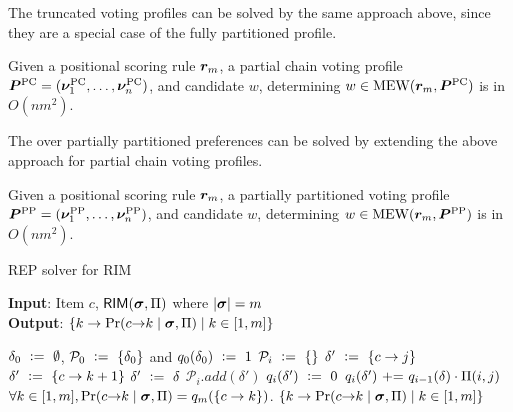 The truncated voting profiles can be solved by the same approach above, since they are a special case of the fully partitioned profile.

\def\theoremTractabilityOfPC{
  Given a positional scoring rule $\vr_m$, a partial chain voting profile $\pchainVP = (\enum[n]{\pchain})$, and candidate $w$, determining $w \in \mew(\vr_m, \pchainVP)$ is in $O(nm^2)$.
}

\begin{theorem} \label{theorem:tractability_of_pchainVP}
    \theoremTractabilityOfPC
\end{theorem}

The \mew over partially partitioned preferences can be solved by extending the above approach for partial chain voting profiles.

\def\theoremTractabilityOfPP{
  Given a positional scoring rule $\vr_m$, a partially partitioned voting profile $\parparVP = (\enum[n]{\parpar})$, and candidate $w$, determining $w \in \mew(\vr_m, \parparVP)$ is in $O(nm^2)$.
}

\begin{theorem} \label{theorem:tractability_of_parparVP}
  \theoremTractabilityOfPP
\end{theorem}

\begin{algorithm}[tb!]
\small 
  \raggedright
  \caption{REP solver for RIM}
  \label{alg:rim_rank_estimation}
  \textbf{Input}: Item $c$, $\mathsf{RIM}(\bm{\sigma}, \Pi)$ where $|\bm{\sigma}| = m$ \\
  \textbf{Output}: $\{ k \rightarrow \Pr(c {\rightarrow} k \mid \bm{\sigma}, \Pi) \mid k \in [1, m] \}$
  
  \begin{algorithmic}[1] %
    \STATE $\delta_0 \ \mathrel{\mathop:}= \  \emptyset$, $\mathcal{P}_0 \ \mathrel{\mathop:}= \  \{ \delta_0 \}$ and $q_0(\delta_0) \ \mathrel{\mathop:}= \  1$
    \STATE $\mathcal{P}_i \ \mathrel{\mathop:}= \  \{  \}$
     \label{alg:rim_rank_estimation:j}
    \STATE $\delta' \ \mathrel{\mathop:}= \  \{ c \rightarrow j \}$
    \STATE $\delta' \ \mathrel{\mathop:}= \  \{ c \rightarrow k + 1 \}$
    \ELSE
    \STATE $\delta' \ \mathrel{\mathop:}= \  \delta$
    \ENDIF
    \STATE $\mathcal{P}_i.add(\delta')$
    \STATE $q_i(\delta') \ \mathrel{\mathop:}= \  0$
    \ENDIF
    \STATE $q_i(\delta') {\ \mathrel{{+}{=}}} \  q_{i-1}(\delta) \cdot \Pi(i, j)$
    \ENDFOR
    \ENDFOR
    \ENDFOR
    \STATE $\forall k \in [1, m], \Pr(c {\rightarrow} k \mid \bm{\sigma}, \Pi) = q_m(\{ c \rightarrow k \})$.
    \RETURN $\{ k \rightarrow \Pr(c {\rightarrow} k \mid \bm{\sigma}, \Pi) \mid k \in [1, m] \}$
  \end{algorithmic}
\end{algorithm}

